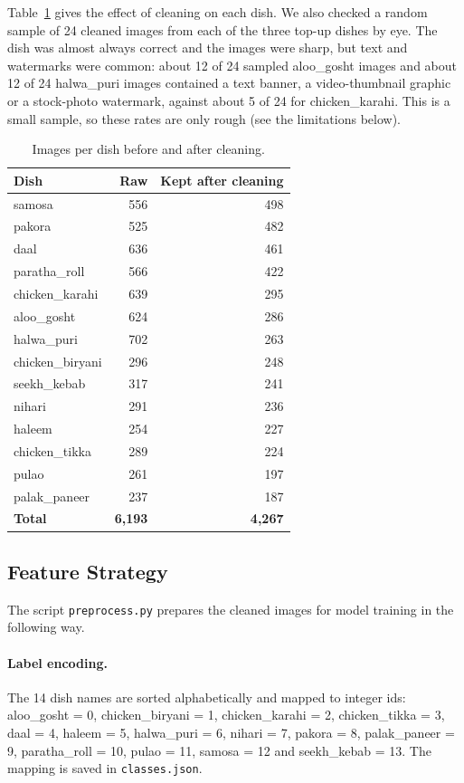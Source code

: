 Table~\ref{tab:perdish} gives the effect of cleaning on each dish. We also checked a random sample of 24 cleaned images from each of the three top-up dishes by eye. The dish was almost always correct and the images were sharp, but text and watermarks were common: about 12 of 24 sampled aloo\_gosht images and about 12 of 24 halwa\_puri images contained a text banner, a video-thumbnail graphic or a stock-photo watermark, against about 5 of 24 for chicken\_karahi. This is a small sample, so these rates are only rough (see the limitations below).

\begin{table}[H]
  \centering
  \begin{tabular}{|l|r|r|}
    \hline
    \textbf{Dish} & \textbf{Raw} & \textbf{Kept after cleaning} \\
    \hline
    samosa          & 556 & 498 \\
    pakora          & 525 & 482 \\
    daal            & 636 & 461 \\
    paratha\_roll   & 566 & 422 \\
    chicken\_karahi & 639 & 295 \\
    aloo\_gosht     & 624 & 286 \\
    halwa\_puri     & 702 & 263 \\
    chicken\_biryani & 296 & 248 \\
    seekh\_kebab    & 317 & 241 \\
    nihari          & 291 & 236 \\
    haleem          & 254 & 227 \\
    chicken\_tikka  & 289 & 224 \\
    pulao           & 261 & 197 \\
    palak\_paneer   & 237 & 187 \\
    \hline
    \textbf{Total}  & \textbf{6,193} & \textbf{4,267} \\
    \hline
  \end{tabular}
  \caption{Images per dish before and after cleaning.}
  \label{tab:perdish}
\end{table}

\subsection{Feature Strategy}
The script \texttt{preprocess.py} prepares the cleaned images for model training in the following way.

\paragraph{Label encoding.} The 14 dish names are sorted alphabetically and mapped to integer ids: aloo\_gosht = 0, chicken\_biryani = 1, chicken\_karahi = 2, chicken\_tikka = 3, daal = 4, haleem = 5, halwa\_puri = 6, nihari = 7, pakora = 8, palak\_paneer = 9, paratha\_roll = 10, pulao = 11, samosa = 12 and seekh\_kebab = 13. The mapping is saved in \texttt{classes.json}.

